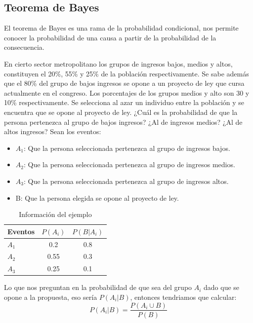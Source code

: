 \subsection{Teorema de Bayes}
El teorema de Bayes es una rama de la probabilidad condicional, nos permite conocer la probabilidad de una causa a partir de la probabilidad de la consecuencia.
\begin{ejemplo}
    En cierto sector metropolitano los grupos de ingresos bajos, medios y altos, constituyen el 20\%, 55\% y 25\% de la población respectivamente. Se sabe además que el 80\% del grupo de bajos ingresos se opone a un proyecto de ley que cursa actualmente en el congreso. Los porcentajes de los grupos medios y alto son 30 y 10\% respectivamente. Se selecciona al azar un individuo entre la población y se encuentra que se opone al proyecto de ley. ¿Cuál es la probabilidad de que la persona pertenezca al grupo de bajos ingresos? ¿Al de ingresos medios? ¿Al de altos ingresos?
    Sean los eventos:
    \begin{itemize}
        \item $A_1$: Que la persona seleccionada pertenezca al grupo de ingresos bajos.
        \item $A_2$: Que la persona seleccionada pertenezca al grupo de ingresos medios.
        \item $A_3$: Que la persona seleccionada pertenezca al grupo de ingresos altos.
        \item B: Que la persona elegida se opone al proyecto de ley.
    \end{itemize}
    \begin{table}[H]
        \centering
        \begin{tabular}{lcc}\hline
            Eventos & $P(A_i)$ & $P(B|A_i)$ \\ \hline
            $A_1$   & 0.2      & 0.8        \\
            $A_2$   & 0.55     & 0.3        \\
            $A_3$   & 0.25     & 0.1        \\\hline
        \end{tabular}
        \caption{Información del ejemplo}
    \end{table}
    Lo que nos preguntan en la probabilidad de que sea del grupo $A_i$ dado que se opone a la propuesta, eso sería $P(A_i|B)$, entonces tendriamos que calcular:
    \begin{equation*}
        P(A_i|B)=\frac{P(A_i \cup B)}{P(B)}
    \end{equation*}

\end{ejemplo}
